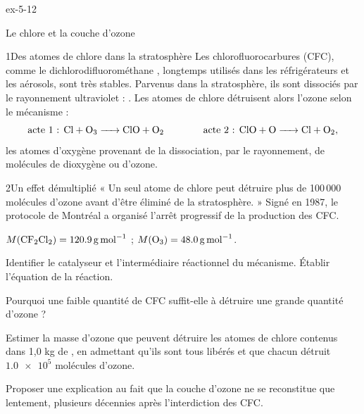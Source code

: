 \begin{blocLivre}{ex-5-12}
\begin{exercice}[3]{Le chlore et la couche d'ozone}
\begin{docu}{1}{Des atomes de chlore dans la stratosphère}
Les chlorofluorocarbures (CFC), comme le dichlorodifluorométhane , longtemps utilisés dans les
réfrigérateurs et les aérosols, sont très stables. Parvenus dans la stratosphère, ils sont dissociés par le
rayonnement ultraviolet : . Les atomes de chlore détruisent alors l'ozone selon le mécanisme :
\[\text{acte 1 : }\ce{Cl + O3 -> ClO + O2}\qquad\qquad\text{acte 2 : }\ce{ClO + O -> Cl + O2},\]
les atomes d'oxygène provenant de la dissociation, par le rayonnement, de molécules de dioxygène ou d'ozone.
\end{docu}
\begin{docu}{2}{Un effet démultiplié}
« Un seul atome de chlore peut détruire plus de 100\,000 molécules d'ozone avant d'être éliminé de la stratosphère. »
Signé en 1987, le protocole de Montréal a organisé l'arrêt progressif de la production des CFC.
\end{docu}
\begin{donnees}
$M(\ce{CF2Cl2})=\qty{120,9}{g.mol^{-1}}$ ; $M(\ce{O3})=\qty{48,0}{g.mol^{-1}}$.
\end{donnees}
\begin{questions}
\item Identifier le catalyseur et l'intermédiaire réactionnel du mécanisme. Établir l'équation de la réaction.
\item Pourquoi une faible quantité de CFC suffit-elle à détruire une grande quantité d'ozone ?
\item \initiative Estimer la masse d'ozone que peuvent détruire les atomes de chlore contenus dans 1,0 kg de
, en admettant qu'ils sont tous libérés et que chacun détruit $\num{1.0e5}$ molécules d'ozone.
\item Proposer une explication au fait que la couche d'ozone ne se reconstitue que lentement, plusieurs décennies
après l'interdiction des CFC.
\end{questions}
\end{exercice}
\end{blocLivre}
